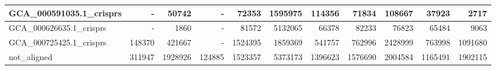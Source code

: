 \documentclass[12pt,a4paper]{article}
\begin{document}
\begin{table}[ht]
\begin{center}
\begin{tabular}{|l*{10}{|r}|}
GCA\_000591035.1\_crisprs & - & 50742 & - & 72353 & 1595975 & 114356 & 71834 & 108667 & 37923 & 2717 \\ \hline
GCA\_000626635.1\_crisprs & - & 1860 & - & 81572 & 5132065 & 66378 & 82233 & 76823 & 65484 & 9063 \\ \hline
GCA\_000725425.1\_crisprs & 148370 & 421667 & - & 1524395 & 1859369 & 541757 & 762996 & 2428999 & 763998 & 1091680 \\ \hline
not\_aligned & 311947 & 1928926 & 124885 & 1523357 & 5373173 & 1396623 & 1576690 & 2004584 & 1165491 & 1902115 \\ \hline
\end{tabular}
\end{center}
\end{table}
\end{document}
